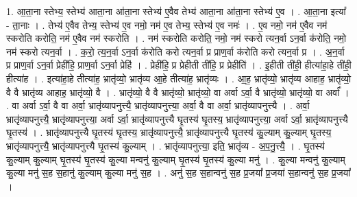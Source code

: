 \documentclass[17pt]{extarticle}
\begin{document}
1. आ॒ता॒ना स्तेभ्य॒ स्तेभ्य॑ आता॒ना आ॑ता॒ना स्तेभ्य॑ ए॒वैव तेभ्य॑ आता॒ना आ॑ता॒ना स्तेभ्य॑ ए॒व । . आ॒ता॒ना इत्या᳚ - ता॒नाः । . तेभ्य॑ ए॒वैव तेभ्य॒ स्तेभ्य॑ ए॒व नमो॒ नम॑ ए॒व तेभ्य॒ स्तेभ्य॑ ए॒व नमः॑ । . ए॒व नमो॒ नम॑ ए॒वैव नम॑ स्करोति करोति॒ नम॑ ए॒वैव नम॑ स्करोति । . नम॑ स्करोति करोति॒ नमो॒ नम॑ स्करो त्यन॒र्वा ऽन॒र्वा क॑रोति॒ नमो॒ नम॑ स्करो त्यन॒र्वा । . क॒रो॒ त्य॒न॒र्वा ऽन॒र्वा क॑रोति करो त्यन॒र्वा प्र प्राण॒र्वा क॑रोति करो त्यन॒र्वा प्र । . अ॒न॒र्वा प्र प्राण॒र्वा ऽन॒र्वा प्रेही॑हि॒ प्राण॒र्वा ऽन॒र्वा प्रेहि॑ । . प्रेही॑हि॒ प्र प्रेहीती ती॑हि॒ प्र प्रेहीति॑ । . इ॒हीती ती॑ही॒ हीत्या॑हा॒हे ती॑ही॒ हीत्या॑ह । . इत्या॑हा॒हे तीत्या॑ह॒ भ्रातृ॑व्यो॒ भ्रातृ॑व्य आ॒हे तीत्या॑ह॒ भ्रातृ॑व्यः । . आ॒ह॒ भ्रातृ॑व्यो॒ भ्रातृ॑व्य आहाह॒ भ्रातृ॑व्यो॒ वै वै भ्रातृ॑व्य आहाह॒ भ्रातृ॑व्यो॒ वै । . भ्रातृ॑व्यो॒ वै वै भ्रातृ॑व्यो॒ भ्रातृ॑व्यो॒ वा अर्वा ऽर्वा॒ वै भ्रातृ॑व्यो॒ भ्रातृ॑व्यो॒ वा अर्वा᳚ । . वा अर्वा ऽर्वा॒ वै वा अर्वा॒ भ्रातृ॑व्यापनुत्त्यै॒ भ्रातृ॑व्यापनुत्त्या॒ अर्वा॒ वै वा अर्वा॒ भ्रातृ॑व्यापनुत्त्यै । . अर्वा॒ भ्रातृ॑व्यापनुत्त्यै॒ भ्रातृ॑व्यापनुत्त्या॒ अर्वा ऽर्वा॒ भ्रातृ॑व्यापनुत्त्यै घृ॒तस्य॑ घृ॒तस्य॒ भ्रातृ॑व्यापनुत्त्या॒ अर्वा ऽर्वा॒ भ्रातृ॑व्यापनुत्त्यै घृ॒तस्य॑ । . भ्रातृ॑व्यापनुत्त्यै घृ॒तस्य॑ घृ॒तस्य॒ भ्रातृ॑व्यापनुत्त्यै॒ भ्रातृ॑व्यापनुत्त्यै घृ॒तस्य॑ कु॒ल्याम् कु॒ल्याम् घृ॒तस्य॒ भ्रातृ॑व्यापनुत्त्यै॒ भ्रातृ॑व्यापनुत्त्यै घृ॒तस्य॑ कु॒ल्याम् । . भ्रातृ॑व्यापनुत्त्या॒ इति॒ भ्रातृ॑व्य - अ॒प॒नु॒त्त्यै॒ । . घृ॒तस्य॑ कु॒ल्याम् कु॒ल्याम् घृ॒तस्य॑ घृ॒तस्य॑ कु॒ल्या मन्वनु॑ कु॒ल्याम् घृ॒तस्य॑ घृ॒तस्य॑ कु॒ल्या मनु॑ । . कु॒ल्या मन्वनु॑ कु॒ल्याम् कु॒ल्या मनु॑ स॒ह स॒हानु॑ कु॒ल्याम् कु॒ल्या मनु॑ स॒ह । . अनु॑ स॒ह स॒हान्वनु॑ स॒ह प्र॒जया᳚ प्र॒जया॑ स॒हान्वनु॑ स॒ह प्र॒जया᳚ । \newline
\end{document}
